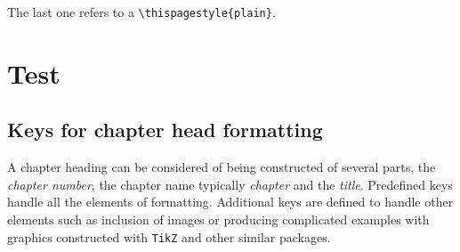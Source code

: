\begin{decription}
The last one refers to a \lstinline!\thispagestyle{plain}!.
\chapter{Test}




\section*{Keys for chapter head formatting}

A chapter heading can be considered of being constructed of several parts, the \textit{chapter number}, the chapter name typically \textit{chapter} and the \textit{title}. Predefined keys handle all the elements of formatting. Additional keys are defined to handle other elements such as inclusion of images or producing complicated examples with graphics constructed with \texttt{TikZ} and other similar packages.



\end{decription}
